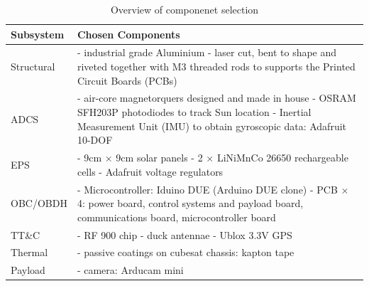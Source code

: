 \begin{table}[H]
   \centering
   \caption{Overview of componenet selection}
   \vspace{0.2cm}
   \label{tab:components}
   {\renewcommand{\arraystretch}{1.4}%
   \begin{tabular}{|>{\arraybackslash}m{3cm}|>{\arraybackslash}m{12cm}|}
         \hline
         \textbf{Subsystem} & \textbf{Chosen Components} \\\hline\hline
         Structural & 	 - industrial grade Aluminium\newline
                         - laser cut, bent to shape and riveted together with M3 threaded rods to supports the Printed Circuit Boards (PCBs)\\\hline
         ADCS & 		 - air-core magnetorquers designed and made in house\newline
                         - OSRAM SFH203P photodiodes to track Sun location\newline
                         - Inertial Measurement Unit (IMU) to obtain gyroscopic data: Adafruit 10-DOF\\\hline
         EPS & - 9cm $\times$ 9cm solar 			panels\newline
                         - 2 $\times$ LiNiMnCo 26650 rechargeable cells\newline
                         - Adafruit voltage regulators\\\hline
         OBC/OBDH & - Microcontroller: Iduino DUE (Arduino DUE clone)\newline
                         - PCB $\times$ 4: power board, control systems and payload board, communications board, microcontroller board\\\hline
         TT\&C &
                         - RF 900 chip\newline
                         - duck antennae\newline
                         - Ublox 3.3V GPS\\\hline
         Thermal & 		 - passive coatings on cubesat chassis: kapton tape\\\hline
         Payload & 		 - camera: Arducam mini\\\hline  
   \end{tabular} } 
\end{table}

